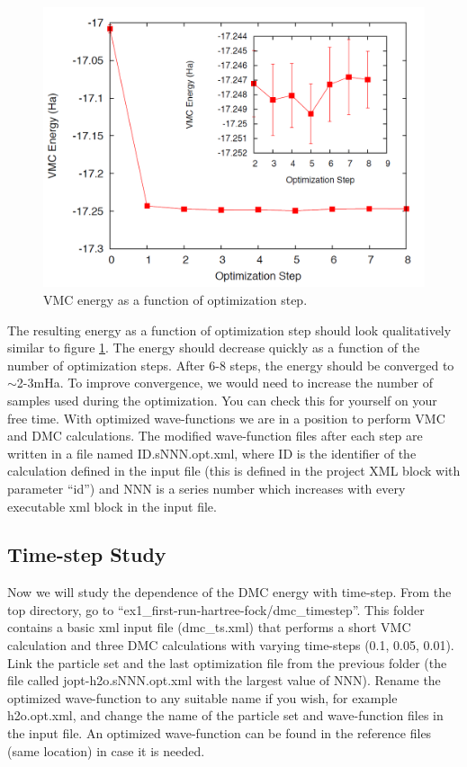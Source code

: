 \begin{figure}
\begin{center}
\includegraphics[trim = 0mm 0mm 0mm 0mm, clip,width=0.75\columnwidth]{./figures/lab_advanced_molecules_opt_conv}
\end{center}
\caption{VMC energy as a function of optimization step.
\label{fig:lam_opt_conv}
}
\end{figure}

The resulting energy as a function of optimization step should look qualitatively similar to figure \ref{fig:lam_opt_conv}.
The energy should decrease quickly as a function of the number of optimization steps. After 6-8 steps, the energy should be converged to $\sim$2-3mHa. To improve convergence,
we would need to increase the number of samples used during the optimization. You can
check this for yourself on your free time. With optimized wave-functions we are in a position
to perform VMC and DMC calculations. The modified wave-function files after each step
are written in a file named ID.sNNN.opt.xml, where ID is the identifier of the calculation
defined in the input file (this is defined in the project XML block with parameter “id”) and
NNN is a series number which increases with every executable xml block in the input file.


\subsection{Time-step Study}
Now we will study the dependence of the DMC energy with time-step. From the top directory, 
go to “ex1\_first-run-hartree-fock/dmc\_timestep”. This folder contains a basic xml input
file (dmc\_ts.xml) that performs a short VMC calculation and three DMC calculations
with varying time-steps (0.1, 0.05, 0.01). Link the particle set and the last optimization
file from the previous folder (the file called jopt-h2o.sNNN.opt.xml with the largest value of
NNN). Rename the optimized wave-function to any suitable name if you wish, for example
h2o.opt.xml, and change the name of the particle set and wave-function files in the
input file. An optimized wave-function can be found in the reference files (same location)
in case it is needed. %

